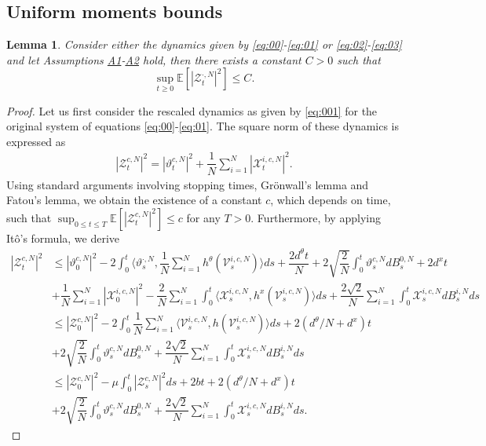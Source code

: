 \documentclass[a4paper, 10pt]{article}
\theoremstyle{plain}%
\newtheorem{lemma}{Lemma}%
\begin{document}
\subsection{Uniform moments bounds}
\begin{lemma}\label{lemma0} Consider either the dynamics given by \eqref{eq:00}-\eqref{eq:01} or \eqref{eq:02}-\eqref{eq:03} and let Assumptions \hyperlink{Assum1}{A1}-\hyperlink{Assum2}{A2} hold, then there exists a constant $C>0$ such that $$\sup_{t\geq 0}\mathbb{E}\left[|\mathcal{Z}_{t}^{\cdot,N}|^2\right]\leq C.$$\end{lemma}
\begin{proof}
    Let us first consider the rescaled dynamics as given by \eqref{eq:001} for the original system of equations \eqref{eq:00}-\eqref{eq:01}. The square norm of these dynamics is expressed as
\begin{align*}
    |\mathcal{Z}_{t}^{c,N}|^2=|\vartheta_{t}^{c,N}|^2+\dfrac{1}{N}\sum_{i=1}^{N}|\mathcal{X}_{t}^{i,c,N}|^2.
\end{align*}
Using standard arguments involving stopping times, Gr\"{o}nwall's lemma and Fatou's lemma, we obtain the existence of a constant $c$, which depends on time, such that $\sup_{0\leq t\leq T}\mathbb{E}\left[|\mathcal{Z}_{t}^{c,N}|^2\right]\leq c$ for any $T>0$. Furthermore, by applying It\^{o}'s formula, we derive
\begin{align*}
    |\mathcal{Z}_{t}^{c,N}|^2&\leq |\vartheta_{0}^{c,N}|^2-2\int_0^t\langle \vartheta_{s}^{\cdot,N},\dfrac{1}{N}\sum_{i=1}^N h^{\theta}(\mathcal{V}_{s}^{i,c,N})\rangle ds+\dfrac{2d^{\theta}t}{N}+2\sqrt{\dfrac{2}{N}}\int_0^t \vartheta_{s}^{c,N}dB_{s}^{0,N}+2d^x t\\
    &+\dfrac{1}{N}\sum_{i=1}^N|\mathcal{X}_{0}^{i,c,N}|^2-\dfrac{2}{N}\sum_{i=1}^N\int_0^t\langle \mathcal{X}_s^{i,c,N},h^{x}(\mathcal{V}_{s}^{i,c,N})\rangle ds+\dfrac{2\sqrt{2}}{N}\sum_{i=1}^N\int_0^t \mathcal{X}_{s}^{i,c,N}dB_{s}^{i,N}ds\\
    &\leq |\mathcal{Z}_{0}^{c,N}|^2-2\int_0^t\dfrac{1}{N}\sum_{i=1}^N\langle \mathcal{V}_{s}^{i,c,N},h(\mathcal{V}_{s}^{i,c,N})\rangle ds+2(d^{\theta}/N+d^x)t\\
    &+2\sqrt{\dfrac{2}{N}}\int_0^t \vartheta_{s}^{c,N}dB_{s}^{0,N}+\dfrac{2\sqrt{2}}{N}\sum_{i=1}^N\int_0^t \mathcal{X}_{s}^{i,c,N}dB_{s}^{i,N}ds\\
    &\leq |\mathcal{Z}_{0}^{c,N}|^2-\mu\int_0^t |\mathcal{Z}_{s}^{c,N}|^2 ds+2bt+2(d^{\theta}/N+d^x)t\\
    &+2\sqrt{\dfrac{2}{N}}\int_0^t \vartheta_{s}^{c,N}dB_{s}^{0,N}+\dfrac{2\sqrt{2}}{N}\sum_{i=1}^N\int_0^t \mathcal{X}_{s}^{i,c,N}dB_{s}^{i,N}ds.

\end{align*}
\end{proof}
\end{document}

